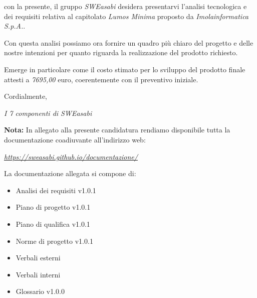 \documentclass{article}
\begin{document}
con la presente, il gruppo \textit{SWEasabi} desidera presentarvi l'analisi tecnologica e dei requisiti relativa al capitolato \textit{Lumos Minima} proposto da \textit{Imolainformatica S.p.A.}.

Con questa analisi possiamo ora fornire un quadro più chiaro del progetto e delle nostre intenzioni per quanto riguarda la realizzazione del prodotto richiesto.

Emerge in particolare come il costo stimato per lo sviluppo del prodotto finale attesti a \textit{7695,00} euro, coerentemente con il preventivo iniziale.

Cordialmente,

\begin{flushright}
\textit{I 7 componenti di SWEasabi}
\end{flushright}

\textbf{Nota:} In allegato alla presente candidatura rendiamo disponibile tutta la documentazione coadiuvante all'indirizzo web:

\begin{center}
    \href{https://sweasabi.github.io/documentazione/}{\textit{https://sweasabi.github.io/documentazione/}}
\end{center}

La documentazione allegata si compone di:
\begin{itemize}
    \item Analisi dei requisiti v1.0.1
    \item Piano di progetto v1.0.1
    \item Piano di qualifica v1.0.1
    \item Norme di progetto v1.0.1
    \item Verbali esterni
    \item Verbali interni
    \item Glossario v1.0.0
\end{itemize}
\end{document}
